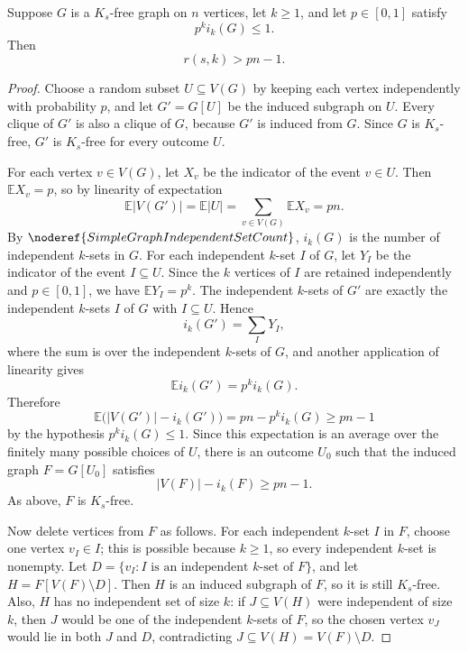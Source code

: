 \begin{lemma}
Suppose \(G\) is a \(K_s\)-free graph on \(n\) vertices, let \(k\ge 1\), and let \(p\in[0,1]\) satisfy
\[
  p^k i_k(G)\le 1.
\]
Then
\[
  r(s,k)>pn-1.
\]
\end{lemma}
\begin{proof}
Choose a random subset \(U\subseteq V(G)\) by keeping each vertex independently with probability \(p\), and let \(G'=G[U]\) be the induced subgraph on \(U\). Every clique of \(G'\) is also a clique of \(G\), because \(G'\) is induced from \(G\). Since \(G\) is \(K_s\)-free, \(G'\) is \(K_s\)-free for every outcome \(U\).

For each vertex \(v\in V(G)\), let \(X_v\) be the indicator of the event \(v\in U\). Then \(\mathbb E X_v=p\), so by linearity of expectation
\[
  \mathbb E |V(G')|=\mathbb E |U|=\sum_{v\in V(G)}\mathbb E X_v=pn.
\]
By \(\noderef{SimpleGraphIndependentSetCount}\), \(i_k(G)\) is the number of independent \(k\)-sets in \(G\). For each independent \(k\)-set \(I\) of \(G\), let \(Y_I\) be the indicator of the event \(I\subseteq U\). Since the \(k\) vertices of \(I\) are retained independently and \(p\in[0,1]\), we have \(\mathbb E Y_I=p^k\). The independent \(k\)-sets of \(G'\) are exactly the independent \(k\)-sets \(I\) of \(G\) with \(I\subseteq U\). Hence
\[
  i_k(G')=\sum_{I} Y_I,
\]
where the sum is over the independent \(k\)-sets of \(G\), and another application of linearity gives
\[
  \mathbb E i_k(G')=p^k i_k(G).
\]
Therefore
\[
  \mathbb E\bigl(|V(G')|-i_k(G')\bigr)
  =pn-p^k i_k(G)\ge pn-1
\]
by the hypothesis \(p^k i_k(G)\le 1\). Since this expectation is an average over the finitely many possible choices of \(U\), there is an outcome \(U_0\) such that the induced graph \(F=G[U_0]\) satisfies
\[
  |V(F)|-i_k(F)\ge pn-1.
\]
As above, \(F\) is \(K_s\)-free.

Now delete vertices from \(F\) as follows. For each independent \(k\)-set \(I\) in \(F\), choose one vertex \(v_I\in I\); this is possible because \(k\ge1\), so every independent \(k\)-set is nonempty. Let \(D=\{v_I : I \text{ is an independent } k\text{-set of }F\}\), and let \(H=F[V(F)\setminus D]\). Then \(H\) is an induced subgraph of \(F\), so it is still \(K_s\)-free. Also, \(H\) has no independent set of size \(k\): if \(J\subseteq V(H)\) were independent of size \(k\), then \(J\) would be one of the independent \(k\)-sets of \(F\), so the chosen vertex \(v_J\) would lie in both \(J\) and \(D\), contradicting \(J\subseteq V(H)=V(F)\setminus D\).


\end{proof}
